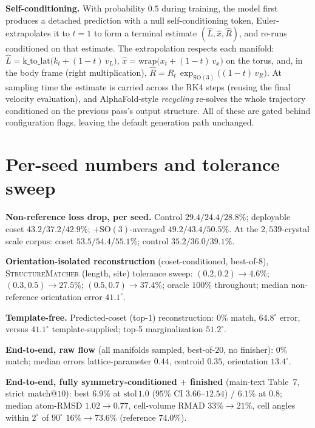 \documentclass[journal=acsodf,manuscript=article]{achemso}
\begin{document}
\textbf{Self-conditioning.} With probability $0.5$ during training, the model first
produces a detached prediction with a null self-conditioning token,
Euler-extrapolates it to $t{=}1$ to form a terminal estimate
$(\hat L,\hat x,\hat R)$, and re-runs conditioned on that estimate. The
extrapolation respects each manifold:
$\hat L=\mathrm{k\_to\_lat}\big(k_t+(1{-}t)\,v_L\big)$,
$\hat x=\mathrm{wrap}\big(x_t+(1{-}t)\,v_x\big)$ on the torus, and, in the body
frame (right multiplication),
$\hat R=R_t\,\exp_{\mathrm{SO}(3)}\!\big((1{-}t)\,v_R\big)$. At sampling time the
estimate is carried across the RK4 steps (reusing the final velocity evaluation),
and AlphaFold-style \emph{recycling} re-solves the whole trajectory conditioned on
the previous pass's output structure. All of these are gated behind configuration
flags, leaving the default generation path unchanged.

\section{Per-seed numbers and tolerance sweep}\label{sisec:numbers}
\textbf{Non-reference loss drop, per seed.} Control $29.4/24.4/28.8\%$; deployable
coset $43.2/37.2/42.9\%$; $+\mathrm{SO}(3)$-averaged $49.2/43.4/50.5\%$. At the
$2{,}539$-crystal scale corpus: coset $53.5/54.4/55.1\%$; control
$35.2/36.0/39.1\%$.

\textbf{Orientation-isolated reconstruction} (coset-conditioned, best-of-$8$),
\textsc{StructureMatcher} (length, site) tolerance sweep:
$(0.2,0.2)\!\to\!4.6\%$; $(0.3,0.5)\!\to\!27.5\%$; $(0.5,0.7)\!\to\!37.4\%$; oracle
$100\%$ throughout; median non-reference orientation error $41.1^\circ$.

\textbf{Template-free.} Predicted-coset (top-1) reconstruction: $0\%$ match,
$64.8^\circ$ error, versus $41.1^\circ$ template-supplied; top-5 marginalization
$51.2^\circ$.

\textbf{End-to-end, raw flow} (all manifolds sampled, best-of-$20$, no finisher):
$0\%$ match; median errors lattice-parameter $0.44$, centroid $0.35$, orientation
$13.4^\circ$.

\textbf{End-to-end, fully symmetry-conditioned $+$ finished} (main-text
Table~7, strict match@$10$): best $6.9\%$ at $\text{stol}\,1.0$ ($95\%$ CI
$3.66$--$12.54$) / $6.1\%$ at $0.8$; median atom-RMSD $1.02\!\to\!0.77$, cell-volume
RMAD $33\%\!\to\!21\%$, cell angles within $2^\circ$ of $90^\circ$
$16\%\!\to\!73.6\%$ (reference $74.0\%$).


\end{document}
